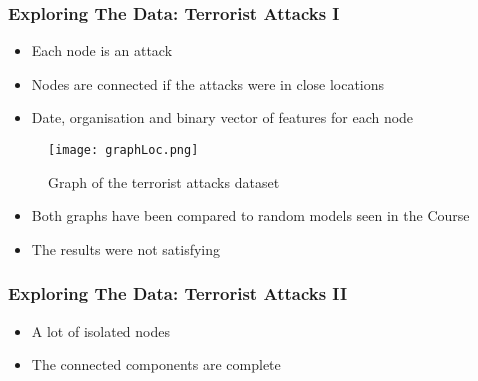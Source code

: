 \begin{frame}
\frametitle{Exploring The Data: Terrorist Attacks I}
	
	\begin{itemize}
		\item Each node is an attack
		\item Nodes are connected if the attacks were in close locations
		\item Date, organisation and binary vector of features for each node
	\end{itemize}
	
	\begin{figure}
		\begin{center}
			\texttt{[image: graphLoc.png]}
			\caption{Graph of the terrorist attacks dataset}
			\label{fig:graph attacks}
		\end{center}
	\end{figure}
	
	\begin{itemize}
	\item	Both graphs have been compared to random models seen in the Course
	\item The results were not satisfying 
	\end{itemize}
\end{frame}

\begin{frame}
\frametitle{Exploring The Data: Terrorist Attacks II}
	
	\begin{center}
	\end{center}
	
	\begin{itemize}
		\item A lot of isolated nodes
		\item The  connected components are complete
	\end{itemize}
\end{frame}